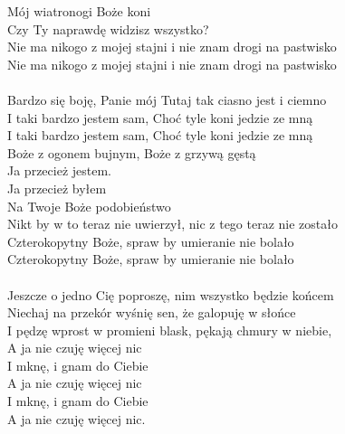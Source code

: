 \begin{text}
Mój wiatronogi Boże koni\\
Czy Ty naprawdę widzisz wszystko?\\
Nie ma nikogo z mojej stajni i nie znam drogi na pastwisko\\
Nie ma nikogo z mojej stajni i nie znam drogi na pastwisko\\
\vin \\

Bardzo się boję, Panie mój Tutaj tak ciasno jest i ciemno\\
I taki bardzo jestem sam, Choć tyle koni jedzie ze mną\\
I taki bardzo jestem sam, Choć tyle koni jedzie ze mną\\

Boże z ogonem bujnym, Boże z grzywą gęstą\\
Ja przecież jestem.\\
Ja przecież byłem\\
Na Twoje Boże podobieństwo\\

Nikt by w to teraz nie uwierzył, nic z tego teraz nie zostało\\
Czterokopytny Boże, spraw by umieranie nie bolało\\
Czterokopytny Boże, spraw by umieranie nie bolało\\
\vin \\

Jeszcze o jedno Cię poproszę, nim wszystko będzie końcem\\
Niechaj na przekór wyśnię sen, że galopuję w słońce\\

I pędzę wprost w promieni blask, pękają chmury w niebie,\\
A ja nie czuję więcej nic\\
I mknę, i gnam do Ciebie\\
A ja nie czuję więcej nic\\
I mknę, i gnam do Ciebie\\
A ja nie czuję więcej nic.\\
\end{text}
